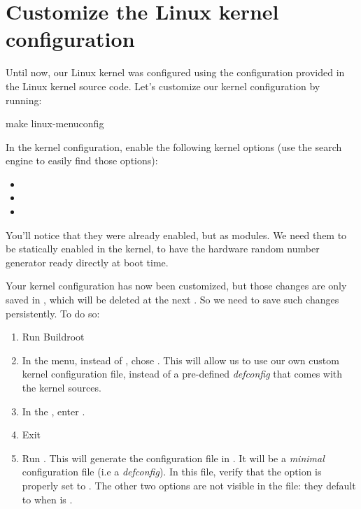 \section{Customize the Linux kernel configuration}

Until now, our Linux kernel was configured using the
 configuration provided in the Linux kernel
source code. Let's customize our kernel configuration by running:

\begin{bashinput}
make linux-menuconfig
\end{bashinput}

In the kernel configuration, enable the following kernel options (use
the \code{/} search engine to easily find those options):

\begin{itemize}
\item {}
\item {}
\item {}
\end{itemize}

You'll notice that they were already enabled, but as modules. We need
them to be statically enabled in the kernel, to have the hardware
random number generator ready directly at boot time.

Your kernel configuration has now been customized, but those changes
are only saved in , which
will be deleted at the next . So we need to save such
changes persistently. To do so:

\begin{enumerate}

\item Run Buildroot 

\item In the  menu, instead of ,
  chose . This will allow us to use
  our own custom kernel configuration file, instead of a pre-defined
  {\em defconfig} that comes with the kernel sources.

\item In the , enter
  .

\item Exit 

\item Run . This will generate the
  configuration file in
  . It will be a {\em
    minimal} configuration file (i.e a {\em defconfig}). In this file,
  verify that the option is properly set to
  . The other two options are not visible in the
   file: they default to  when
   is .

\end{enumerate}

